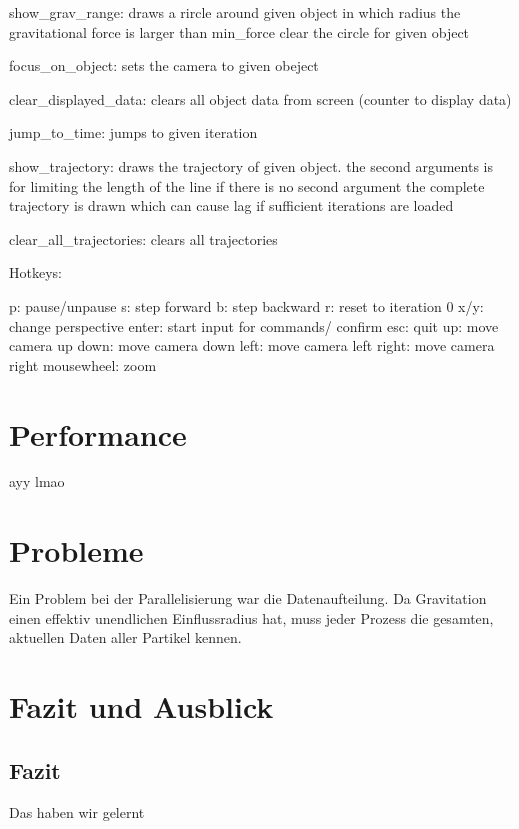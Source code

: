 show_grav_range:
    draws a rircle around given object in which radius the gravitational force is larger than min_force
    clear the circle for given object

focus_on_object:
    sets the camera to given obeject

clear_displayed_data:
    clears all object data from screen (counter to display data)

jump_to_time:
    jumps to given iteration

show_trajectory:
    draws the trajectory of given object.
    the second arguments is for limiting the length of the line
    if there is no second argument the complete trajectory is drawn which can cause lag if
    sufficient iterations are loaded

clear_all_trajectories:
    clears all trajectories

Hotkeys:

p:          pause/unpause
s:          step forward
b:          step backward
r:          reset to iteration 0
x/y:        change perspective
enter:      start input for commands/ confirm
esc:        quit
up:         move camera up
down:       move camera down
left:       move camera left
right:      move camera right
mousewheel: zoom


\section{Performance}
ayy lmao

\section{Probleme}
Ein Problem bei der Parallelisierung war die Datenaufteilung. Da Gravitation einen effektiv
unendlichen Einflussradius hat, muss jeder Prozess die gesamten, aktuellen Daten aller
Partikel kennen.

\section{Fazit und Ausblick}
\subsection{Fazit}
Das haben wir gelernt

